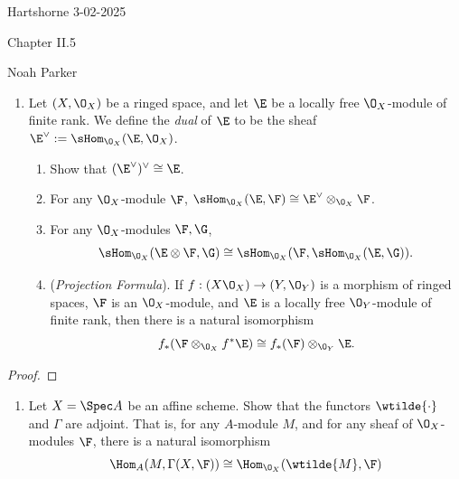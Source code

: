 \documentclass[12pt]{amsart}
\begin{document}
{Hartshorne} \hfill {3-02-2025}

\bigskip\bigskip

\begin{center}

{\sc Chapter II.5}

\end{center}

\begin{center}

  {Noah Parker} 
    
\end{center}

\bigskip\bigskip

\begin{enumerate}
  \item[5.1.] {
      Let $(X,\O_X)$ be a ringed space, and let $\E$ be a locally free $\O_X$-module of finite rank.
      We define the \emph{dual} of $\E$ to be the sheaf $\E^\vee:=\sHom_{\O_X}(\E,\O_X)$.
      \begin{enumerate}
        \item Show that $(\E^\vee)^\vee\cong \E$.
        \item For any $\O_X$-module $\F$, $\sHom_{\O_X}(\E,\F)\cong \E^\vee\otimes_{\O_X}\F$.
        \item For any $\O_X$-modules $\F,\G$,
          \[
            \sHom_{\O_X}(\E\otimes \F,\G)\cong \sHom_{\O_X}(\F,\sHom_{\O_X}(\E,\G)).
          \] 
        \item (\emph{Projection Formula}).
          If $f:(X\O_X)\to (Y,\O_Y)$ is a morphism of ringed spaces, $\F$ is an $\O_X$-module, and $\E$ is a locally free $\O_Y$-module of finite rank, then there is a natural isomorphism 
          \[
            f_*(\F\otimes_{\O_X}f^*\E)\cong f_*(\F)\otimes_{\O_Y}\E.
          \]
      \end{enumerate}
    }
\end{enumerate}

\begin{proof}
\end{proof}

\begin{enumerate}
  \item[5.3.] {
      Let $X=\Spec A$ be an affine scheme.
      Show that the functors $\wtilde{\cdot}$ and $\Gamma$ are adjoint.
      That is, for any $A$-module $M$, and for any sheaf of $\O_X$-modules $\F$, there is a natural isomorphism
      \[
        \Hom_A(M,\Gamma(X,\F))\cong \Hom_{\O_X}(\wtilde{M},\F)
      \] 
    }
\end{enumerate}
\end{document}
